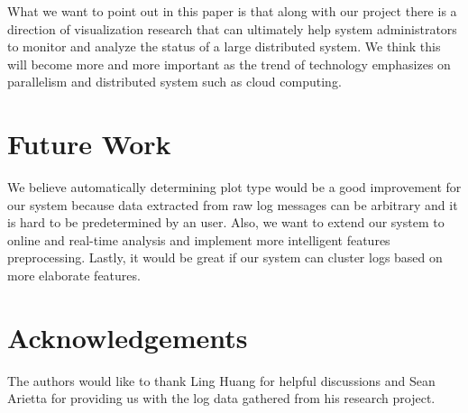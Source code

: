 \documentclass[conference]{style/acmsiggraph}
\begin{document}
What we want to point out in this paper is that along with our project there is a direction of
visualization research that can ultimately help system administrators to monitor and analyze the
status of a large distributed system. We think this will become more and more important as the trend
of technology emphasizes on parallelism and distributed system such as cloud computing.


\section{Future Work}

We believe automatically determining plot type would be a good improvement for our system because
data extracted from raw log messages can be arbitrary and it is hard to be predetermined by an user.
Also, we want to extend our system to online and real-time analysis and implement more intelligent
features preprocessing. Lastly, it would be great if our system can cluster logs based on more
elaborate features.

\section*{Acknowledgements}
The authors would like to thank Ling Huang for helpful discussions and Sean Arietta for providing us with the log data gathered from his research project.




\end{document}
